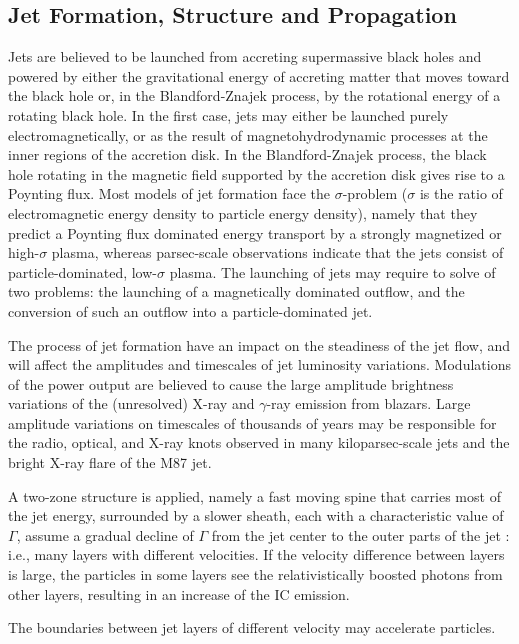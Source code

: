 \documentclass[12pt,a4paper]{article}
\begin{document}
\subsection{Jet Formation, Structure and Propagation}
\cite{2006ARA&A..44..463H} Jets are believed to be launched from accreting supermassive black holes and powered by either the gravitational energy of accreting matter that moves toward the black hole or, in the Blandford-Znajek process, by the rotational energy of a rotating black hole. In the first case, jets may either be launched purely electromagnetically, or as the result of magnetohydrodynamic processes at the inner regions of the accretion disk. In the Blandford-Znajek process, the black hole rotating in the magnetic field supported by the accretion disk gives rise to a Poynting flux. Most models of jet formation face the $\sigma$-problem ($\sigma$ is the ratio of electromagnetic energy density to particle energy density), namely that they predict a Poynting flux dominated energy transport by a strongly magnetized or high-$\sigma$ plasma, whereas parsec-scale observations indicate that the jets consist of particle-dominated, low-$\sigma$ plasma. The launching of jets may require to solve of two problems: the launching of a magnetically dominated outflow, and the conversion of such an outflow into a particle-dominated jet. 

The process of jet formation have an impact on the steadiness of the jet flow, and will affect the amplitudes and timescales of jet luminosity variations. Modulations of the power output are believed to cause the large amplitude brightness variations of the (unresolved) X-ray and $\gamma$-ray emission from blazars. Large amplitude variations on timescales of thousands of years may be responsible for the radio, optical, and X-ray knots observed in many kiloparsec-scale jets and the bright X-ray flare of the M87 jet.

A two-zone structure is applied, namely a fast moving spine that carries most of the jet energy, surrounded by a slower sheath, each with a characteristic value of $\Gamma$, assume a gradual decline of $\Gamma$ from the jet center to the outer parts of the jet : i.e., many layers with different velocities. If the velocity difference between layers is large, the particles in some layers see the relativistically boosted photons from other layers, resulting in an increase of the IC emission. 

The boundaries between jet layers of different velocity may accelerate particles.
\end{document}
